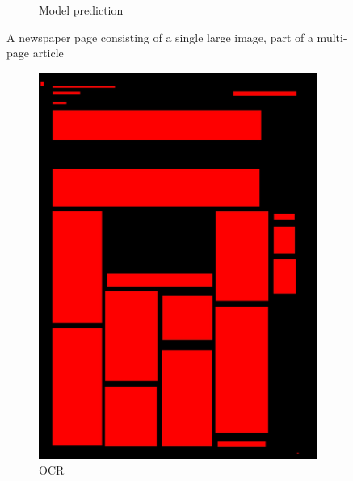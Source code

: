 \documentclass[aspectratio=1610]{beamer}
\begin{document}
\begin{frame}
\begin{figure}
\begin{subfigure}{.25\textwidth}
  \caption{Model prediction}
\end{subfigure}
\caption{A newspaper page consisting of a single large image, part of a multi-page article}
\label{fig:weather}
\end{figure}
\end{frame}
\normalpage

\begin{frame}
  \begin{figure}
\centering
\begin{subfigure}{.25\textwidth}
  \centering
  \includegraphics[width=0.99\linewidth, clip=true, trim = 0mm 0mm 0mm 0mm]{figures/ocr/FZKQ4Zg.jpg}
  \caption{OCR}
\end{subfigure}%
\begin{subfigure}{.25\textwidth}
  \centering

\end{subfigure}
\end{figure}
\end{frame}
\end{document}
